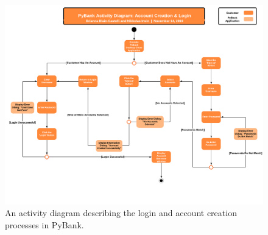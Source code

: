 \begin{figure}[H]
	\begin{centering}
	\includegraphics[width=1.00\linewidth, height=0.75\linewidth]{figures/Activity_Diagram_PyBank.png}
	\caption{An activity diagram describing the login and account creation processes in PyBank.}
	\label{fig:activity_diagram}
	\end{centering}
\end{figure}

